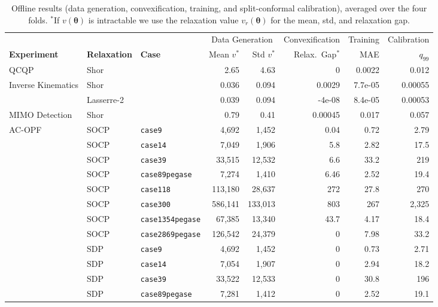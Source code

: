 \documentclass[10pt]{article} %
\theoremstyle{plain}
\theoremstyle{definition}
\theoremstyle{remark}
\begin{document}
\begin{table}[t]
\centering\footnotesize
\caption{Offline results (data generation, convexification, training, and split-conformal
calibration), averaged over the four folds. ${}^\ast$If $v(\bm{\theta})$ is intractable we
use the relaxation value $v_r(\bm{\theta})$ for the mean, std, and relaxation gap.}
\label{tab:offline}
\begin{tabular}{lll rr r r r}
\toprule
& & & \multicolumn{2}{c}{Data Generation} & Convexification & Training & Calibration \\
\cmidrule(lr){4-5}\cmidrule(lr){6-6}\cmidrule(lr){7-7}\cmidrule(lr){8-8}
\textbf{Experiment} & \textbf{Relaxation} & \textbf{Case} &
Mean $v^\ast$ & Std $v^\ast$ & Relax.\ Gap$^\ast$ & MAE & $q_{99}$ \\
\midrule
  \multirow{1}{*}{QCQP} & Shor &  & 2.65 & 4.63 & 0 & 0.0022 & 0.012 \\
\midrule
  \multirow{2}{*}{Inverse Kinematics} & Shor &  & 0.036 & 0.094 & 0.0029 & 7.7e-05 & 0.00055 \\
   & Lasserre-2 &  & 0.039 & 0.094 & -4e-08 & 8.4e-05 & 0.00053 \\
\midrule
  \multirow{1}{*}{MIMO Detection} & Shor &  & 0.79 & 0.41 & 0.00045 & 0.017 & 0.057 \\
\midrule
  \multirow{15}{*}{AC-OPF} & SOCP & \texttt{case9} & 4,692 & 1,452 & 0.04 & 0.72 & 2.79 \\
   & SOCP & \texttt{case14} & 7,049 & 1,906 & 5.8 & 2.82 & 17.5 \\
   & SOCP & \texttt{case39} & 33,515 & 12,532 & 6.6 & 33.2 & 219 \\
   & SOCP & \texttt{case89pegase} & 7,274 & 1,410 & 6.46 & 2.52 & 19.4 \\
   & SOCP & \texttt{case118} & 113,180 & 28,637 & 272 & 27.8 & 270 \\
   & SOCP & \texttt{case300} & 586,141 & 133,013 & 803 & 267 & 2,325 \\
   & SOCP & \texttt{case1354pegase} & 67,385 & 13,340 & 43.7 & 4.17 & 18.4 \\
   & SOCP & \texttt{case2869pegase} & 126,542 & 24,379 & 0 & 7.98 & 33.2 \\
   & SDP & \texttt{case9} & 4,692 & 1,452 & 0 & 0.73 & 2.71 \\
   & SDP & \texttt{case14} & 7,054 & 1,907 & 0 & 2.94 & 18.2 \\
   & SDP & \texttt{case39} & 33,522 & 12,533 & 0 & 30.8 & 196 \\
   & SDP & \texttt{case89pegase} & 7,281 & 1,412 & 0 & 2.52 & 19.1 \\

\end{tabular}
\end{table}
\end{document}
